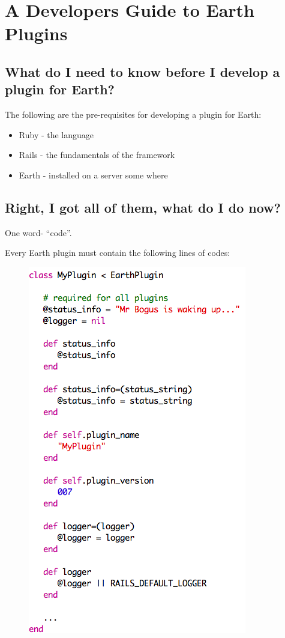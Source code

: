 \documentclass{article}
\begin{document}
\section*{A Developers Guide to Earth Plugins}

\subsection*{What do I need to know before I develop a plugin for Earth?}

The following are the pre-requisites for developing a plugin for Earth:

\begin{itemize}
   \item Ruby - the language
   \item Rails - the fundamentals of the framework
   \item Earth - installed on a server some where
\end{itemize} 


\subsection*{Right, I got all of them, what do I do now?}

One word- ``code''.

Every Earth plugin must contain the following lines of codes:

\begin{figure}[h]
   \centering
   \includegraphics[scale=0.5]{plugin_standard_codes.png}
\end{figure}
\end{document}

